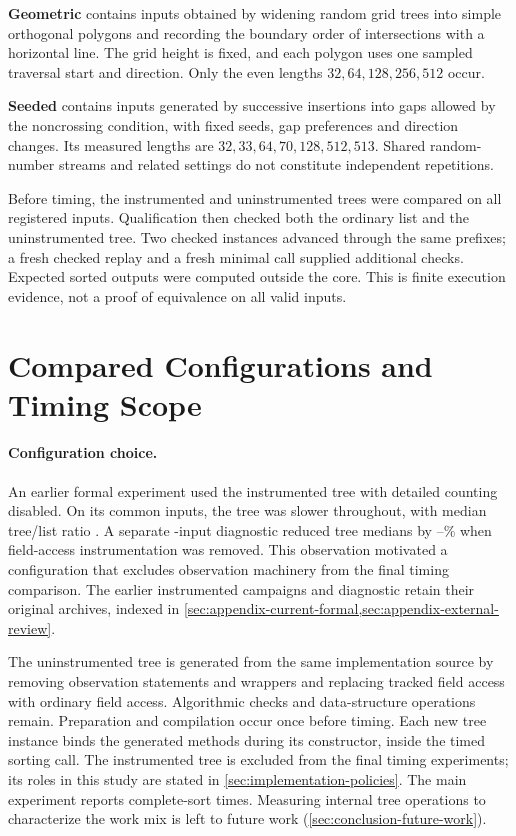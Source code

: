 \textbf{Geometric} contains \UnifiedGeometricN{} inputs obtained by widening
random grid trees into simple orthogonal polygons and recording the boundary
order of intersections with a horizontal line. The grid height is fixed, and
each polygon uses one sampled traversal start and direction. Only the even
lengths $32,64,128,256,512$ occur.

\textbf{Seeded} contains \UnifiedSeededN{} inputs generated by successive
insertions into gaps allowed by the noncrossing condition, with fixed seeds,
gap preferences and direction changes. Its measured lengths are
$32,33,64,70,128,512,513$. Shared random-number streams and related settings
do not constitute independent repetitions.

Before timing, the instrumented and uninstrumented trees were compared on
all registered inputs. Qualification then checked both the ordinary list and
the uninstrumented tree. Two checked instances advanced through the same
prefixes; a fresh checked replay and a fresh minimal call supplied additional
checks. Expected sorted outputs were computed outside the core. This is finite
execution evidence, not a proof of equivalence on all valid inputs.

\section{Compared Configurations and Timing Scope}
\label{sec:method-implementations}

\paragraph{Configuration choice.}
An earlier formal experiment used the instrumented tree with detailed counting
disabled. On its \OldCommonN{} common inputs, the tree was slower throughout,
with median tree/list ratio \OldCommonMedian{}. A separate
\OldDiagnosticN{}-input diagnostic reduced tree medians by
\OldDiagnosticDropLow{}--\OldDiagnosticDropHigh{}\% when field-access
instrumentation was removed. This observation motivated a configuration that
excludes observation machinery from the final timing comparison. The earlier
instrumented campaigns and diagnostic retain their original archives, indexed
in \cref{sec:appendix-current-formal,sec:appendix-external-review}.

The uninstrumented tree is generated from the same implementation source by
removing observation statements and wrappers and replacing tracked field
access with ordinary field access. Algorithmic checks and data-structure
operations remain. Preparation and compilation occur once before timing.
Each new tree instance binds the generated methods during its constructor,
inside the timed sorting call. The instrumented tree is excluded from the
final timing experiments; its roles in this study are stated in
\cref{sec:implementation-policies}. The main experiment reports complete-sort times.
Measuring internal tree operations to characterize the work mix is left to future work
(\cref{sec:conclusion-future-work}).

